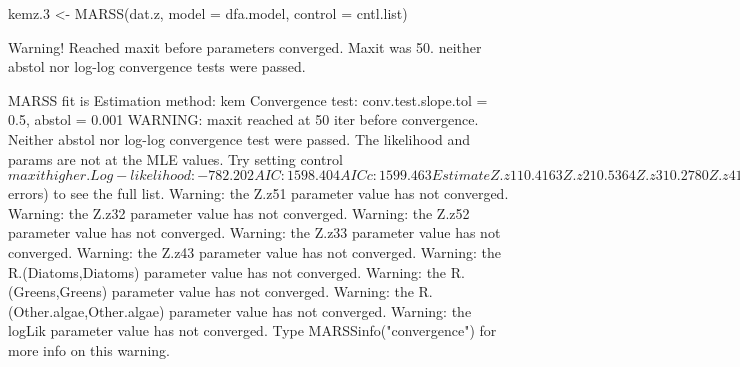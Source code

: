 \begin{Schunk}
\begin{Sinput}
 kemz.3 <- MARSS(dat.z, model = dfa.model, control = cntl.list)
\end{Sinput}
\begin{Soutput}
Warning! Reached maxit before parameters converged. Maxit was 50.
 neither abstol nor log-log convergence tests were passed.

MARSS fit is
Estimation method: kem 
Convergence test: conv.test.slope.tol = 0.5, abstol = 0.001
WARNING: maxit reached at  50  iter before convergence.
 Neither abstol nor log-log convergence test were passed.
 The likelihood and params are not at the MLE values.
 Try setting control$maxit higher.
Log-likelihood: -782.202 
AIC: 1598.404   AICc: 1599.463   
 
                            Estimate
Z.z11                         0.4163
Z.z21                         0.5364
Z.z31                         0.2780
Z.z41                         0.5179
Z.z51                         0.1611
Z.z22                         0.6757
Z.z32                        -0.2381
Z.z42                        -0.2381
Z.z52                        -0.2230
Z.z33                         0.2305
Z.z43                        -0.1225
Z.z53                         0.3887
R.(Cryptomonas,Cryptomonas)   0.6705
R.(Diatoms,Diatoms)           0.0882
R.(Greens,Greens)             0.7201
R.(Unicells,Unicells)         0.1865
R.(Other.algae,Other.algae)   0.5441
Initial states (x0) defined at t=0

Standard errors have not been calculated. 
Use MARSSparamCIs to compute CIs and bias estimates.

Convergence warnings
10 warnings. First 10 shown.  Type cat(object$errors) to see the full list.
 Warning: the  Z.z51  parameter value has not converged.
 Warning: the  Z.z32  parameter value has not converged.
 Warning: the  Z.z52  parameter value has not converged.
 Warning: the  Z.z33  parameter value has not converged.
 Warning: the  Z.z43  parameter value has not converged.
 Warning: the  R.(Diatoms,Diatoms)  parameter value has not converged.
 Warning: the  R.(Greens,Greens)  parameter value has not converged.
 Warning: the  R.(Other.algae,Other.algae)  parameter value has not converged.
 Warning: the  logLik  parameter value has not converged.
 Type MARSSinfo("convergence") for more info on this warning.
\end{Soutput}
\end{Schunk}
